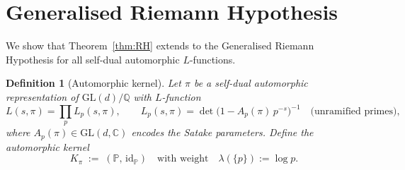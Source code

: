 \documentclass[12pt,a4paper]{article}
\newtheorem{definition}[theorem]{Definition}
\theoremstyle{remark}
\begin{document}
\section{Generalised Riemann Hypothesis}
\label{sec:GRH}

%
%

We show that Theorem~\ref{thm:RH} extends to the Generalised Riemann
Hypothesis for all self-dual automorphic $L$-functions.

\begin{definition}[Automorphic kernel]\label{def:Kpi}
Let $\pi$ be a self-dual automorphic representation of
$\mathrm{GL}(d)/\mathbb{Q}$ with $L$-function
\[
  L(s,\pi) = \prod_p L_p(s,\pi),
  \qquad
  L_p(s,\pi) = \det\!\bigl(1 - A_p(\pi)\,p^{-s}\bigr)^{-1}
  \quad\text{(unramified primes)},
\]
where $A_p(\pi)\in\mathrm{GL}(d,\mathbb{C})$ encodes the Satake parameters.
Define the \emph{automorphic kernel}
\[
  K_\pi \;:=\; (\mathbb{P},\,\mathrm{id}_\mathbb{P})
  \quad\text{with weight}\quad
  \lambda(\{p\}) := \log p.
\]
\end{definition}

\end{document}
